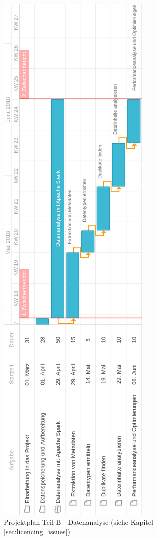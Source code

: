 \begin{figure}[p]
  \centering
  \includegraphics[width=\textwidth,height=\textheight,keepaspectratio]{./resource/ganttB.png}
  \caption{Projektplan Teil B - Datenanalyse (siehe Kapitel \ref{sec:licencing_issues})}
  \label{fig:ganttB}
\end{figure}

